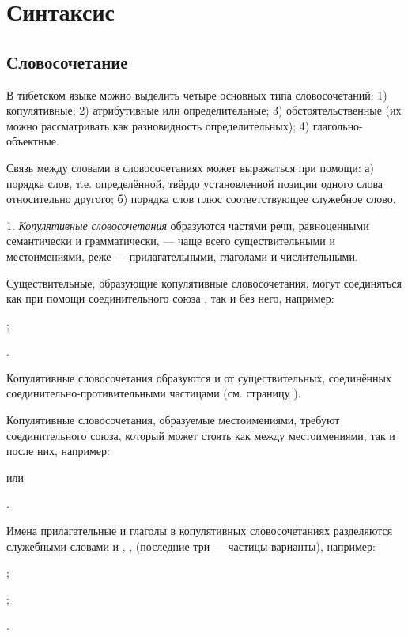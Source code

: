 \chapter{Синтаксис}

\section{Словосочетание}

В тибетском языке можно выделить четыре основных типа словосочетаний: 1) копулятивные; 2) атрибутивные или определительные; 3) обстоятельственные (их можно рассматривать как разновидность определительных); 4) глагольно-объектные.

Связь между словами в словосочетаниях может выражаться при помощи: а) порядка слов, т.е. определённой, твёрдо установленной позиции одного слова относительно другого; б) порядка слов плюс соответствующее служебное слово.

1. \emph{Копулятивные словосочетания} образуются частями речи, равноценными семантически и грамматически, --- чаще всего существительными и местоимениями, реже --- прилагательными, глаголами и числительными.

Существительные, образующие копулятивные словосочетания, могут соединяться как при помощи соединительного союза , так и без него, например:
\begin{prfsample}
	\item {};
	\item {}.
\end{prfsample}
Копулятивные словосочетания образуются и от существительных, соединённых соединительно-противительными частицами (см. страницу \pageref{sec:ss:soed_protiv}).

Копулятивные словосочетания, образуемые местоимениями, требуют соединительного союза, который может стоять как между местоимениями, так и после них, например:
\begin{prfsample}
	\item {} или
	\item {}.
\end{prfsample}

Имена прилагательные и глаголы в копулятивных словосочетаниях разделяются служебными словами  и , ,  (последние три --- частицы-варианты), например:
\begin{prfsample}
	\item {};
	\item {};
	\item {}.
\end{prfsample}

